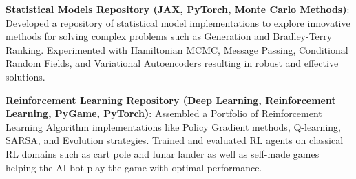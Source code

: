 \documentclass[a4paper]{article}
\newcommand{\resumeItem}[2]{
  \item\small{
    \textbf{#1}{: #2 \vspace{-2pt}}
  }
}
\newcommand{\resumeSubItem}[2]{\resumeItem{#1}{#2}\vspace{-3pt}}
\begin{document}
\resumeSubItem{Statistical Models Repository (JAX, PyTorch, Monte Carlo Methods)}
{\href{https://github.com/stars/ojasraundale/lists/statistical-models}{\faGithubSquare}
\newline 
Developed a repository of statistical model implementations to explore innovative methods for solving complex problems such as Generation and Bradley-Terry Ranking. Experimented with Hamiltonian MCMC, Message Passing, Conditional Random Fields, and Variational Autoencoders resulting in robust and effective solutions.
} 
\resumeSubItem{Reinforcement Learning Repository (Deep Learning, Reinforcement Learning, PyGame, PyTorch)}{\href{https://github.com/stars/ojasraundale/lists/reinforcement-learning}{\faGithubSquare}
\newline Assembled a Portfolio of Reinforcement Learning Algorithm implementations like Policy Gradient methods, Q-learning, SARSA, and Evolution strategies. Trained and evaluated RL agents on classical RL domains such as cart pole and lunar lander as well as self-made games helping the AI bot play the game with optimal performance.}


\vspace{2pt}



\end{document}
